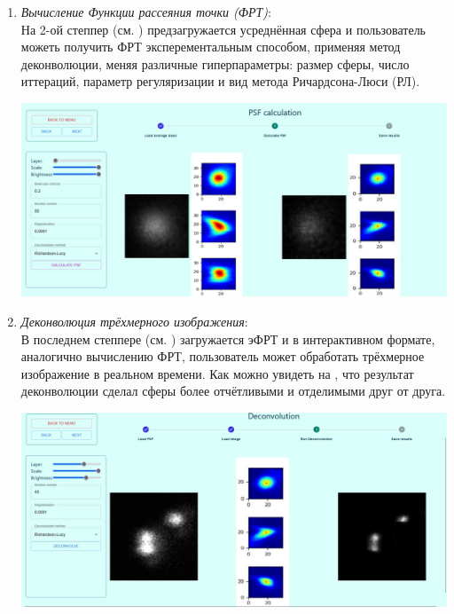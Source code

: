 \begin{enumerate}[]
\begin{minipage}{\textwidth}
	\label{fig:avg-stepper}  
	\vspace{\mfloatsep} %
\end{minipage}
\item \textit{Вычисление Функции рассеяния точки (ФРТ)}:\\
На 2-ой степпер (см. ) предзагружается усреднённая сфера и пользователь можеть получить ФРТ эксперементальным способом, применяя метод деконволюции, меняя различные гиперпараметры: размер сферы, число иттераций, параметр регуляризации и вид метода Ричардсона-Люси (РЛ).\\
\begin{minipage}{\textwidth}
	\centering
	\vspace{\mfloatsep} %
	\includegraphics[keepaspectratio=true,scale=0.3] {my_folder/images/online_service/stepper_psf.png}
	\label{fig:psf-stepper}  
	\vspace{\mfloatsep} %
\end{minipage}
\item \textit{Деконволюция трёхмерного изображения}:\\
В последнем степпере (см. ) загружается эФРТ и в интерактивном формате, аналогично вычислению ФРТ, пользователь может обработать трёхмерное изображение в реальном времени. Как можно увидеть на , что результат деконволюции сделал сферы более отчётливыми и отделимыми друг от друга. \\
\begin{minipage}{\textwidth}
	\centering
	\vspace{\mfloatsep} %
	\includegraphics[keepaspectratio=true,scale=0.25] {my_folder/images/online_service/deconvolution.png}

\end{minipage}
\end{enumerate}
